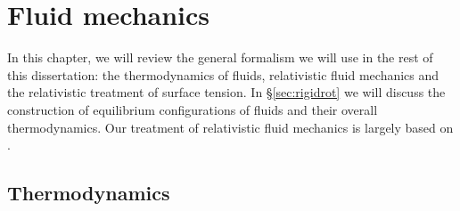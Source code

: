 \chapter{Fluid mechanics}\label{ch:fluids}



In this chapter, we will review the general formalism we will use in the rest of this dissertation: the thermodynamics of fluids, relativistic fluid mechanics and the relativistic treatment of surface tension. In \S\ref{sec:rigidrot} we will discuss the construction of equilibrium configurations of fluids and their overall thermodynamics. Our treatment of relativistic fluid mechanics is largely based on \cite{Andersson:2006nr}.


\section{Thermodynamics}\label{sec:fltherm}

